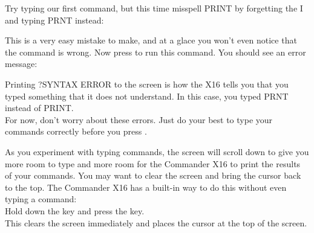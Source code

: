 Try typing our first command, but this time misspell {\ttfamily PRINT} by
forgetting the {\ttfamily I} and typing {\ttfamily PRNT} instead:


This is a very easy mistake to make, and at a glace you won't even notice that
the command is wrong.  Now press \returnkey to run this command.  You should
see an error message:

{
	\raggedleft
}


Printing {\ttfamily ?SYNTAX ERROR} to the screen is how the X16 tells you that
you typed something that it does not understand.  In this case, you typed
{\ttfamily PRNT} instead of {\ttfamily PRINT}.\\

For now, don't worry about these errors.  Just do your best to type your
commands correctly before you press \returnkey.

As you experiment with typing commands, the screen will scroll down to give you
more room to type and more room for the Commander X16 to print the results of
your commands.  You may want to clear the screen and bring the cursor back to
the top.  The Commander X16 has a built-in way to do this without even typing a
command:\\

Hold down the \shiftkey key and press the \clrhomekey key.\\

This clears the screen immediately and places the cursor at the top of the
screen.\\


